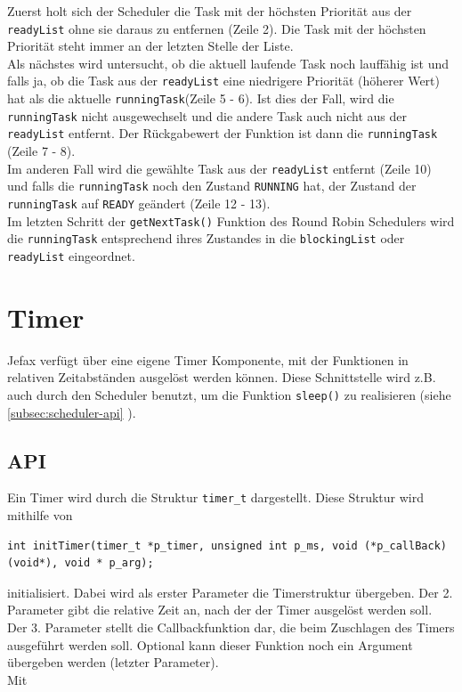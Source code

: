 \documentclass[fontsize=12pt, toc=bibliography, notitlepage]{scrreprt}
\newcommand{\refnn}[1]{\ref{#1} \nameref{#1}}
\begin{document}
Zuerst holt sich der Scheduler die Task mit der höchsten Priorität aus der \lstinline$readyList$ ohne sie daraus zu entfernen (Zeile 2). Die Task mit der höchsten Priorität steht immer an der letzten Stelle der Liste.\\
Als nächstes wird untersucht, ob die aktuell laufende Task noch lauffähig ist und falls ja, ob die Task aus der \lstinline$readyList$ eine niedrigere Priorität (höherer Wert) hat als die aktuelle \lstinline$runningTask$(Zeile 5 - 6). Ist dies der Fall, wird die \lstinline$runningTask$ nicht ausgewechselt und die andere Task auch nicht aus der \lstinline$readyList$ entfernt. Der Rückgabewert der Funktion ist dann die \lstinline$runningTask$ (Zeile 7 - 8).\\
Im anderen Fall wird die gewählte Task aus der \lstinline$readyList$ entfernt (Zeile 10) und falls die \lstinline$runningTask$ noch den Zustand \lstinline$RUNNING$ hat, der Zustand der \lstinline$runningTask$ auf \lstinline$READY$ geändert (Zeile 12 - 13).\\

Im letzten Schritt der \lstinline$getNextTask()$ Funktion des Round Robin Schedulers wird die \lstinline$runningTask$ entsprechend ihres Zustandes in die \lstinline$blockingList$ oder \lstinline$readyList$ eingeordnet.\\

\chapter{Timer}
\label{chap:timer}
Jefax verfügt über eine eigene Timer Komponente, mit der Funktionen in relativen Zeitabständen ausgelöst werden können. Diese Schnittstelle wird z.B. auch durch den Scheduler benutzt, um die Funktion \lstinline$sleep()$ zu realisieren (siehe \refnn{subsec:scheduler-api}).

\section{API}
\label{sec:timer-api}
Ein Timer wird durch die Struktur \lstinline$timer_t$ dargestellt. Diese Struktur wird mithilfe von 

\begin{lstlisting}
int initTimer(timer_t *p_timer, unsigned int p_ms, void (*p_callBack) (void*), void * p_arg);
\end{lstlisting}

initialisiert. Dabei wird als erster Parameter die Timerstruktur übergeben. Der 2. Parameter gibt die relative Zeit an, nach der der Timer ausgelöst werden soll. Der 3. Parameter stellt die Callbackfunktion dar, die beim Zuschlagen des Timers ausgeführt werden soll. Optional kann dieser Funktion noch ein Argument übergeben werden (letzter Parameter).\\
Mit 
\end{document}
